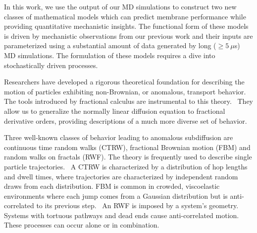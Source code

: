 \documentclass{article}
\begin{document}
  In this work, we use the output of our MD simulations to construct two new classes of 
  mathematical models which can predict membrane performance while providing quantitative 
  mechanistic insights. The functional form of these models is driven by mechanistic 
  observations from our previous work and their inputs are parameterized using a 
  substantial amount of data generated by long ($\geq 5~\mu$s) MD simulations. The formulation
  of these models requires a dive into stochastically driven processes.
  
%  
  
  Researchers have developed a rigorous theoretical foundation for describing the 
  motion of particles exhibiting non-Brownian, or anomalous, transport behavior.
  \cite{metzler_random_2000,bouchaud_anomalous_1990} The tools introduced by 
  fractional calculus are instrumental to this theory.~\cite{gorenflo_fractional_1997}
  They allow us to generalize the normally linear diffusion equation to fractional
  derivative orders, providing descriptions of a much more diverse set of behavior.~\cite{klages_anomalous_2008}

  Three well-known classes of behavior leading to anomalous subdiffusion are 
  continuous time random walks (CTRW), fractional Brownian motion
  (FBM) and random walks on fractals (RWF).\cite{meroz_toolbox_2015}
  The theory is frequently used to describe single particle trajectories.~\cite{morrin_three_2018,metzler_anomalous_2014}
  A CTRW is characterized by a distribution of hop lengths and dwell times, 
  where trajectories are characterized by independent random draws from 
  each distribution.\cite{montroll_random_1965} FBM is common in crowded,
  viscoelastic environments where each jump comes from a Gaussian distribution
  but is anti-correlated to its previous step.~\cite{mandelbrot_fractional_1968,jeon_fractional_2010,banks_anomalous_2005}
  An RWF is imposed by a system's geometry. Systems with tortuous pathways 
  and dead ends cause anti-correlated motion.\cite{meroz_toolbox_2015,neusius_subdiffusion_2008}
  These processes can occur alone or in combination.
\end{document}
